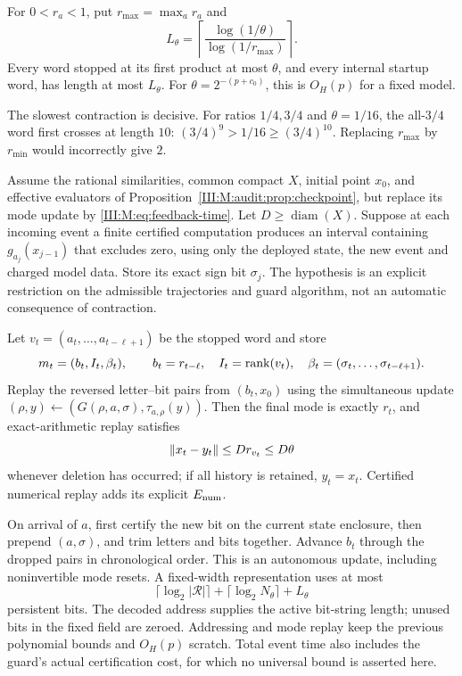 \begin{lemma}\label{III:M:lem:feedback-length}
For $0<r_a<1$, put $r_{\max}=\max_a r_a$ and
\[
 L_\theta=\left\lceil\frac{\log(1/\theta)}{\log(1/r_{\max})}\right\rceil.
\]
Every word stopped at its first product at most $\theta$, and every
internal startup word, has length at most $L_\theta$. For
$\theta=2^{-(p+c_0)}$, this is $O_H(p)$ for a fixed model.
\end{lemma}

The slowest contraction is decisive. For ratios $1/4,3/4$ and
$\theta=1/16$, the all-$3/4$ word first crosses at length $10$:
$(3/4)^9>1/16\ge(3/4)^{10}$. Replacing $r_{\max}$ by $r_{\min}$
would incorrectly give $2$.

\begin{theorem}\label{III:M:thm:branch-cache}
Assume the rational similarities, common compact $X$, initial point $x_0$,
and effective evaluators of Proposition~\ref{III:M:audit:prop:checkpoint}, but
replace its mode update by \eqref{III:M:eq:feedback-time}. Let $D\ge\operatorname{diam}(X)$.
Suppose at each incoming event a finite certified computation produces
an interval containing $g_{a_j}(x_{j-1})$ that excludes zero, using only
the deployed state, the new event and charged model data. Store its exact
sign bit $\sigma_j$. The hypothesis is an explicit restriction on the
admissible trajectories and guard algorithm, not an automatic consequence
of contraction.

Let $v_t=(a_t,\ldots,a_{t-\ell+1})$ be the stopped word and store
\[
 m_t=(b_t,I_t,\beta_t),\qquad
 b_t=r_{t-\ell},\quad I_t=\operatorname{rank}(v_t),\quad
 \beta_t=(\sigma_t,\ldots,\sigma_{t-\ell+1}).
\]
Replay the reversed letter--bit pairs from $(b_t,x_0)$ using the
simultaneous update $(\rho,y)\leftarrow
(G(\rho,a,\sigma),\tau_{a,\rho}(y))$.
Then the final mode is exactly $r_t$, and exact-arithmetic replay satisfies
\[
 \left\lVert x_t-y_t\right\rVert\le D r_{v_t}\le D\theta
\]
whenever deletion has occurred; if all history is retained, $y_t=x_t$.
Certified numerical replay adds its explicit $E_{\rm num}$.

On arrival of $a$, first certify the new bit on the current state enclosure,
then prepend $(a,\sigma)$, and trim letters and bits together. Advance $b_t$
through the dropped pairs in chronological order. This is an autonomous
update, including noninvertible mode resets. A fixed-width representation
uses at most
\begin{equation}\label{III:M:eq:branch-bits}
 \lceil\log_2|\mathcal R|\rceil+
 \lceil\log_2N_\theta\rceil+L_\theta
\end{equation}
persistent bits. The decoded address supplies the active bit-string length;
unused bits in the fixed field are zeroed. Addressing and mode replay keep
the previous polynomial bounds and $O_H(p)$ scratch. Total event time also
includes the guard's actual certification cost, for which no universal
bound is asserted here.
\end{theorem}


